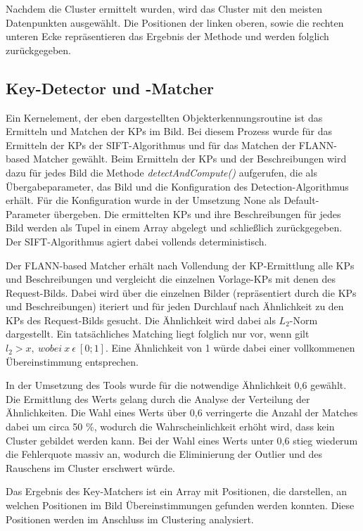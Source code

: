 \documentclass[
    type=Prakikumsbericht,
    status=draft, %
    language=german, %
    bibengine=bibtex,
]{unibwm-inf-thesis}
\begin{document}
    Nachdem die Cluster ermittelt wurden, wird das Cluster mit den meisten Datenpunkten ausgewählt.
    Die Positionen der linken oberen, sowie die rechten unteren Ecke repräsentieren das Ergebnis der Methode und werden folglich zurückgegeben.

    \subsection{Key-Detector und -Matcher} \label{subsubsec:Key-Detector-Matcher}
    Ein Kernelement, der eben dargestellten Objekterkennungsroutine ist das Ermitteln und Matchen der \acp{KP} im Bild.
    Bei diesem Prozess wurde für das Ermitteln der \acp{KP} der \ac{SIFT}-Algorithmus und für das Matchen der \ac{FLANN}-based Matcher gewählt.
    Beim Ermitteln der \acp{KP} und der Beschreibungen wird dazu für jedes Bild die Methode \textit{detectAndCompute()} aufgerufen, die als Übergabeparameter, das Bild und die Konfiguration des Detection-Algorithmus erhält.
    Für die Konfiguration wurde in der Umsetzung None als Default-Parameter übergeben.
    Die ermittelten \acp{KP} und ihre Beschreibungen für jedes Bild werden als Tupel in einem Array abgelegt und schließlich zurückgegeben.
    Der \ac{SIFT}-Algorithmus agiert dabei vollends deterministisch.

    Der \ac{FLANN}-based Matcher erhält nach Vollendung der \ac{KP}-Ermittlung alle \acp{KP} und Beschreibungen und vergleicht die einzelnen Vorlage-\acp{KP} mit denen des Request-Bilds.
    Dabei wird über die einzelnen Bilder (repräsentiert durch die \acp{KP} und Beschreibungen) iteriert und für jeden Durchlauf nach Ähnlichkeit zu den \acp{KP} des Request-Bilds gesucht.
    Die Ähnlichkeit wird dabei als $L_{2}$-Norm dargestellt.
    Ein tatsächliches Matching liegt folglich nur vor, wenn gilt $l_{2} > x,~wobei~x~\epsilon~[0; 1]$.
    Eine Ähnlichkeit von 1 würde dabei einer vollkommenen Übereinstimmung entsprechen.

    In der Umsetzung des Tools wurde für die notwendige Ähnlichkeit 0,6 gewählt.
    Die Ermittlung des Werts gelang durch die Analyse der Verteilung der Ähnlichkeiten.
    Die Wahl eines Werts über 0,6 verringerte die Anzahl der Matches dabei um circa 50 \%, wodurch die Wahrscheinlichkeit erhöht wird, dass kein Cluster gebildet werden kann.
    Bei der Wahl eines Werts unter 0,6 stieg wiederum die Fehlerquote massiv an, wodurch die Eliminierung der Outlier und des Rauschens im Cluster erschwert würde.

    Das Ergebnis des Key-Matchers ist ein Array mit Positionen, die darstellen, an welchen Positionen im Bild Übereinstimmungen gefunden werden konnten.
    Diese Positionen werden im Anschluss im Clustering analysiert.
\end{document}
